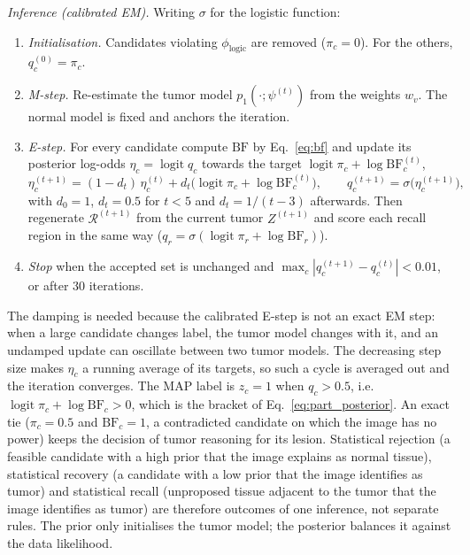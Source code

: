 \documentclass[fleqn,10pt]{olplainarticle}
\begin{document}
\textit{Inference (calibrated EM).} Writing $\sigma$ for the logistic function:
\begin{enumerate}
\item \emph{Initialisation.} Candidates violating $\phi_{\mathrm{logic}}$ are removed ($\pi_c=0$). For the others,
$q_c^{(0)}=\pi_c$.
\item \emph{M-step.} Re-estimate the tumor model $p_1(\cdot;\psi^{(t)})$ from the weights $w_v$. The normal model is fixed
and anchors the iteration.
\item \emph{E-step.} For every candidate compute $\mathrm{BF}$ by Eq.~\eqref{eq:bf} and update its posterior log-odds
$\eta_c=\operatorname{logit}q_c$ towards the target $\operatorname{logit}\pi_c+\log\mathrm{BF}_c^{(t)}$,
\begin{equation}
\label{eq:decision}
\eta_c^{(t+1)}=(1-d_t)\,\eta_c^{(t)}+d_t\bigl(\operatorname{logit}\pi_c+\log\mathrm{BF}_c^{(t)}\bigr),\qquad
q_c^{(t+1)}=\sigma\bigl(\eta_c^{(t+1)}\bigr),
\end{equation}
with $d_0=1$, $d_t=0.5$ for $t<5$ and $d_t=1/(t-3)$ afterwards. Then regenerate $\mathcal{R}^{(t+1)}$ from the current
tumor $Z^{(t+1)}$ and score each recall region in the same way ($q_r=\sigma(\operatorname{logit}\pi_r+\log\mathrm{BF}_r)$).
\item \emph{Stop} when the accepted set is unchanged and $\max_c|q_c^{(t+1)}-q_c^{(t)}|<0.01$, or after $30$ iterations.
\end{enumerate}
The damping is needed because the calibrated E-step is not an exact EM step: when a large candidate changes label, the tumor
model changes with it, and an undamped update can oscillate between two tumor models. The decreasing step size makes
$\eta_c$ a running average of its targets, so such a cycle is averaged out and the iteration converges.
The MAP label is $\hat z_c=1$ when $q_c>0.5$, i.e. $\operatorname{logit}\pi_c+\log\mathrm{BF}_c>0$, which is the
bracket of Eq.~\eqref{eq:part_posterior}. An exact tie ($\pi_c=0.5$ and $\mathrm{BF}_c=1$, a contradicted candidate on which
the image has no power) keeps the decision of tumor reasoning for its lesion. Statistical rejection (a feasible candidate with a high prior that the image
explains as normal tissue), statistical recovery (a candidate with a low prior that the image identifies as tumor) and
statistical recall (unproposed tissue adjacent to the tumor that the image identifies as tumor) are therefore outcomes of
one inference, not separate rules. The prior only initialises the tumor model; the posterior balances it against the data
likelihood.
\end{document}
